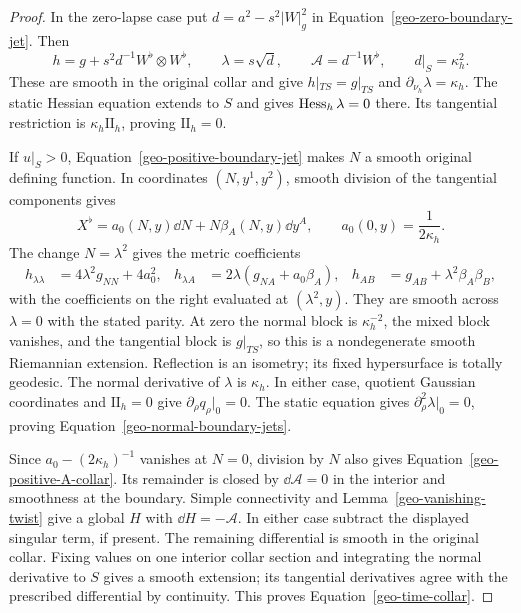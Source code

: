 \begin{proof}
In the zero-lapse case put $d=a^2-s^2|W|_g^2$ in
Equation~\eqref{geo-zero-boundary-jet}.  Then
\[
 h=g+s^2d^{-1}W^\flat\otimes W^\flat,
 \qquad \lambda=s\sqrt d,
 \qquad \mathcal A=d^{-1}W^\flat,
 \qquad d|_S=\kappa_h^2.
\]
These are smooth in the original collar and give
$h|_{TS}=g|_{TS}$ and $\partial_{\nu_h}\lambda=\kappa_h$.
The static Hessian equation extends to $S$ and gives $\operatorname{Hess}_h\lambda=0$
there.  Its tangential restriction is $\kappa_h\mathrm{II}_h$, proving
$\mathrm{II}_h=0$.

If $u|_S>0$, Equation~\eqref{geo-positive-boundary-jet} makes $N$ a smooth
original defining function.  In coordinates $(N,y^1,y^2)$, smooth division
of the tangential components gives
\[
 X^\flat=a_0(N,y)\dd N+N\beta_A(N,y)\dd y^A,
 \qquad a_0(0,y)=\frac1{2\kappa_h}.
\]
The change $N=\lambda^2$ gives the metric coefficients
\begin{align}
 h_{\lambda\lambda}&=4\lambda^2g_{NN}+4a_0^2,
 &h_{\lambda A}&=2\lambda(g_{NA}+a_0\beta_A),
 &h_{AB}&=g_{AB}+\lambda^2\beta_A\beta_B,
 \label{geo-even-odd-collar}
\end{align}
with the coefficients on the right evaluated at $(\lambda^2,y)$.  They are
smooth across $\lambda=0$ with the stated parity.  At zero the normal block
is $\kappa_h^{-2}$, the mixed block vanishes, and the tangential block is
$g|_{TS}$, so this is a nondegenerate smooth Riemannian extension.
Reflection is an isometry; its fixed hypersurface is totally geodesic.
The normal derivative of $\lambda$ is $\kappa_h$.
In either case, quotient Gaussian coordinates and $\mathrm{II}_h=0$ give
$\partial_\rho q_\rho|_0=0$.  The static equation gives
$\partial_\rho^2\lambda|_0=0$, proving
Equation~\eqref{geo-normal-boundary-jets}.

Since $a_0-(2\kappa_h)^{-1}$ vanishes at $N=0$, division by $N$ also gives
Equation~\eqref{geo-positive-A-collar}.  Its remainder is closed by
$\dd\mathcal A=0$ in the interior and smoothness at the boundary.
Simple connectivity and Lemma~\ref{geo-vanishing-twist} give a global $H$
with $\dd H=-\mathcal A$.  In either case subtract the displayed singular
term, if present.  The remaining differential is smooth in the original
collar.  Fixing values on one interior collar section and integrating the
normal derivative to $S$ gives a smooth extension; its tangential
derivatives agree with the prescribed differential by continuity.  This
proves Equation~\eqref{geo-time-collar}.
\end{proof}

